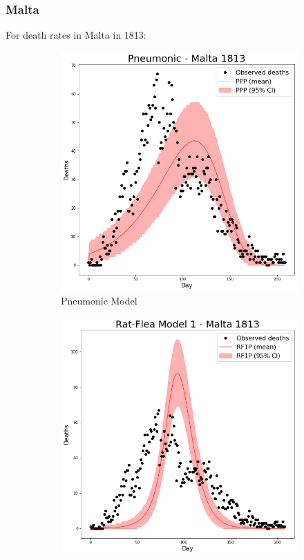 \documentclass [letterpaper, 12pt] {article}
\begin{document}
\newpage
\subsubsection{Malta}
For death rates in Malta in 1813:

\begin{figure}[H]
	\begin{subfigure}{0.48\textwidth}
	\includegraphics[width=\linewidth]{pneum_malta.png}
	\caption{Pneumonic Model}
	\end{subfigure}\hspace{\fill}
	\begin{subfigure}{0.48\textwidth}
	\includegraphics[width=\linewidth]{rats1_malta.png}

\end{subfigure}
\end{figure}
\end{document}
